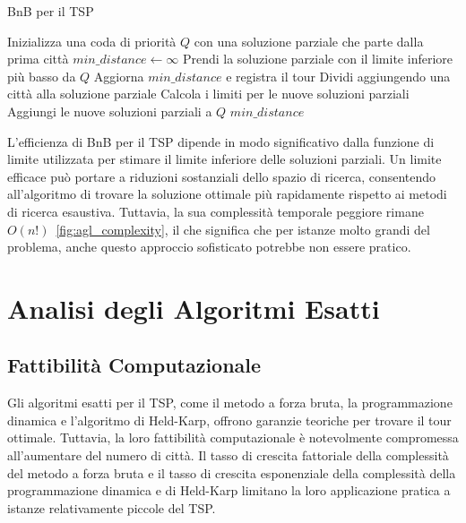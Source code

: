 \begin{algorithm}
	\caption{\gls{BnB} per il \gls{TSP}}\label{branchbound}
	\begin{algorithmic}[1]
		\State Inizializza una coda di priorità $Q$ con una soluzione parziale che parte dalla prima città
		\State $min\_distance \gets \infty$
		\State Prendi la soluzione parziale con il limite inferiore più basso da $Q$
		\State Aggiorna $min\_distance$ e registra il tour
		\EndIf
		\Else
		\State Dividi aggiungendo una città alla soluzione parziale
		\State Calcola i limiti per le nuove soluzioni parziali
		\State Aggiungi le nuove soluzioni parziali a $Q$
		\EndIf
		\EndWhile
		\State \Return $min\_distance$
		\EndProcedure
	\end{algorithmic}
\end{algorithm}

L'efficienza di \gls{BnB} per il \gls{TSP} dipende in modo significativo dalla funzione di limite utilizzata per stimare il limite inferiore delle soluzioni parziali. Un limite efficace può portare a riduzioni sostanziali dello spazio di ricerca, consentendo all'algoritmo di trovare la soluzione ottimale più rapidamente rispetto ai metodi di ricerca esaustiva. Tuttavia, la sua complessità temporale peggiore rimane $O(n!)$~\ref{fig:agl_complexity}, il che significa che per istanze molto grandi del problema, anche questo approccio sofisticato potrebbe non essere pratico.

\section{Analisi degli Algoritmi Esatti}

\subsection{Fattibilità Computazionale}

Gli algoritmi esatti per il \gls{TSP}, come il metodo a forza bruta, la programmazione dinamica e l'algoritmo di Held-Karp, offrono garanzie teoriche per trovare il tour ottimale. Tuttavia, la loro fattibilità computazionale è notevolmente compromessa all'aumentare del numero di città. Il tasso di crescita fattoriale della complessità del metodo a forza bruta e il tasso di crescita esponenziale della complessità della programmazione dinamica e di Held-Karp limitano la loro applicazione pratica a istanze relativamente piccole del \gls{TSP}.

